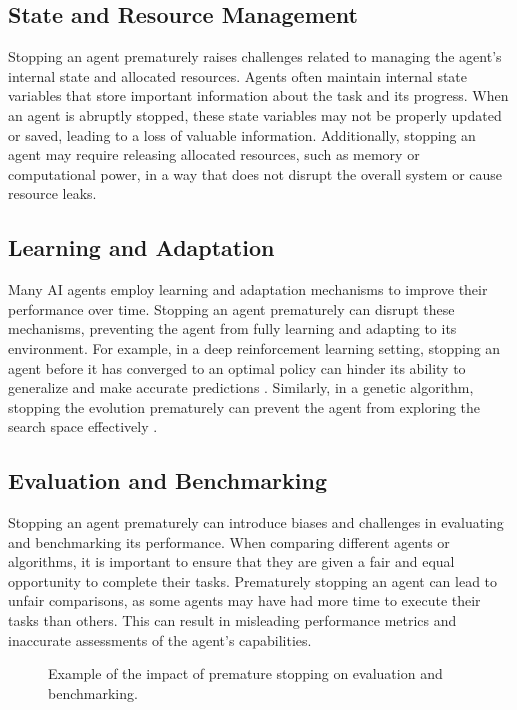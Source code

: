 \documentclass{article}
\begin{document}
\subsection{State and Resource Management}

Stopping an agent prematurely raises challenges related to managing the agent's internal state and allocated resources. Agents often maintain internal state variables that store important information about the task and its progress. When an agent is abruptly stopped, these state variables may not be properly updated or saved, leading to a loss of valuable information. Additionally, stopping an agent may require releasing allocated resources, such as memory or computational power, in a way that does not disrupt the overall system or cause resource leaks.

\subsection{Learning and Adaptation}

Many AI agents employ learning and adaptation mechanisms to improve their performance over time. Stopping an agent prematurely can disrupt these mechanisms, preventing the agent from fully learning and adapting to its environment. For example, in a deep reinforcement learning setting, stopping an agent before it has converged to an optimal policy can hinder its ability to generalize and make accurate predictions \cite{arulkumaran2017deep}. Similarly, in a genetic algorithm, stopping the evolution prematurely can prevent the agent from exploring the search space effectively \cite{back1996evolutionary}.

\subsection{Evaluation and Benchmarking}

Stopping an agent prematurely can introduce biases and challenges in evaluating and benchmarking its performance. When comparing different agents or algorithms, it is important to ensure that they are given a fair and equal opportunity to complete their tasks. Prematurely stopping an agent can lead to unfair comparisons, as some agents may have had more time to execute their tasks than others. This can result in misleading performance metrics and inaccurate assessments of the agent's capabilities.

\begin{figure}[h]
  \centering
  \caption{Example of the impact of premature stopping on evaluation and benchmarking.}
  \label{fig:evaluation_benchmarking}
\end{figure}
\end{document}
